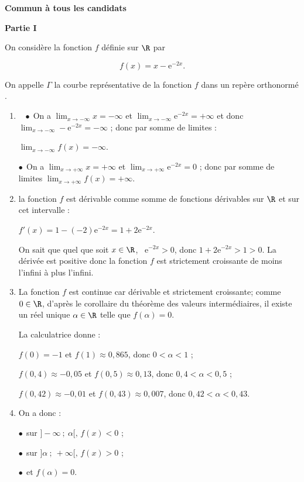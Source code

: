 
\textbf{Commun à tous les candidats}

\medskip

\begin{center}\textbf{Partie I}\end{center}

On considère la fonction $f$ définie sur $\R$ par 

\[f(x) = x - \text{e}^{-2x}.\]

On appelle $\Gamma$ la courbe représentative de la fonction $f$ dans un repère orthonormé \Oij.

\medskip

\begin{enumerate}
\item ~%
$\bullet~~$On a $\displaystyle\lim_{x \to - \infty} x = - \infty$ et $\displaystyle\lim_{x \to - \infty}\text{e}^{-2x} = + \infty$ et donc $\displaystyle\lim_{x \to - \infty}-\text{e}^{-2x} = - \infty$ ; donc par somme de limites :

$\displaystyle\lim_{x \to - \infty}f(x) = - \infty$.

$\bullet~~$On a $\displaystyle\lim_{x \to + \infty} x  = + \infty$ et $\displaystyle\lim_{x \to + \infty}\text{e}^{-2x} = 0$ ; donc par somme de limites  $\displaystyle\lim_{x \to + \infty}f(x) = + \infty$.
\item %
la fonction $f$ est dérivable comme somme de fonctions dérivables sur $\R$ et sur cet intervalle :

$f'(x) = 1 - (- 2)\text{e}^{-2x} = 1 + 2\text{e}^{-2x}$.

On sait que quel que soit $x \in \R$, \, $\text{e}^{-2x} > 0$, donc $ 1 + 2\text{e}^{-2x} > 1 > 0$.
La dérivée est positive donc la fonction $f$ est strictement croissante de moins l'infini à plus l'infini.
\item %
La fonction $f$ est continue car dérivable et strictement croissante; comme $0 \in \R$, d'après le corollaire du théorème des valeurs intermédiaires, il existe un réel unique $\alpha \in \R$ telle que $f(\alpha) = 0$.

La calculatrice donne  :

$f(0) = - 1$ et $f(1) \approx 0,865$, donc $0 < \alpha < 1$ ;

$f(0,4) \approx - 0,05$ et $f(0,5) \approx 0,13$, donc $0,4 < \alpha < 0,5$ ;

$f(0,42) \approx - 0,01$ et $f(0,43) \approx 0,007$, donc $0,42 < \alpha < 0,43$.
\item %
On a donc :

$\bullet~~$sur $]- \infty~;~\alpha[, \, f(x) < 0$ ;

$\bullet~~$sur $]\alpha~;~+ \infty[, \, f(x) > 0$ ;

$\bullet~~$et $f(\alpha) = 0$.
\end{enumerate}

